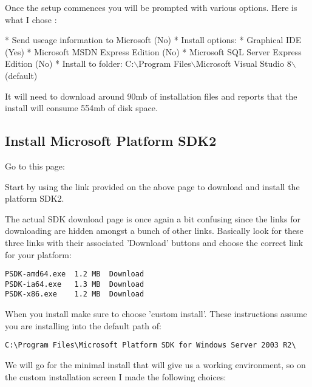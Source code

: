 Once the setup commences you will be prompted with various options. Here is what 
I chose :

 * Send useage information to Microsoft   (No)
 * Install options:
   * Graphical IDE                        (Yes)
   * Microsoft MSDN Express Edition       (No)
   * Microsoft SQL Server Express Edition (No)
 * Install to folder: C:$\backslash$Program Files$\backslash$Microsoft Visual Studio 8$\backslash$   (default)

It will need to download around 90mb of installation files and reports 
that the install will consume 554mb of disk space.

\subsection{Install Microsoft Platform SDK2}
Go to this page:


Start by using the link provided on the above page to download and install the
platform SDK2.

The actual SDK download page is once again a bit confusing since the links for 
downloading are hidden amongst a bunch of other links. Basically look for these 
three links with their associated 'Download' buttons and choose the correct 
link for your platform:

\begin{verbatim}
PSDK-amd64.exe  1.2 MB  Download 
PSDK-ia64.exe   1.3 MB  Download 
PSDK-x86.exe    1.2 MB  Download
\end{verbatim}

When you install make sure to choose 'custom install'. These instructions 
assume you are installing into the default path of:

\begin{verbatim}
C:\Program Files\Microsoft Platform SDK for Windows Server 2003 R2\
\end{verbatim}

We will go for the minimal install that will give us a working environment, 
so on the custom installation screen I made the following choices:

